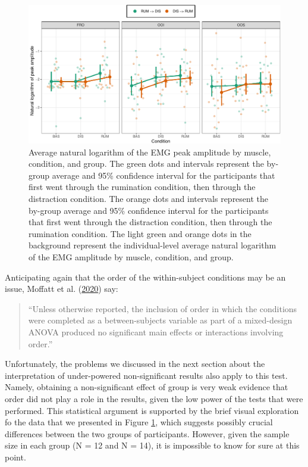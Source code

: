 \documentclass[
  english,
  man, donotrepeattitle,floatsintext]{apa6}
\begin{document}
\begin{figure}[!htb]

{\centering \includegraphics[width=1\linewidth]{manuscript_files/figure-latex/order-1} 

}

\caption{Average natural logarithm of the EMG peak amplitude by muscle, condition, and group. The green dots and intervals represent the by-group average and 95\% confidence interval for the participants that first went through the rumination condition, then through the distraction condition. The orange dots and intervals represent the by-group average and 95\% confidence interval for the participants that first went through the distraction condition, then through the rumination condition. The light green and orange dots in the background represent the individual-level average natural logarithm of the EMG amplitude by muscle, condition, and group.}\label{fig:order}
\end{figure}

Anticipating again that the order of the within-subject conditions may be an issue, Moffatt et al. (\protect\hyperlink{ref-moffatt_inner_2020}{2020}) say:

\begin{quote}
``Unless otherwise reported, the inclusion of order in which the conditions were completed as a between-subjects variable as part of a mixed-design ANOVA produced no significant main effects or interactions involving order.''
\end{quote}

Unfortunately, the problems we discussed in the next section about the interpretation of under-powered non-significant results also apply to this test. Namely, obtaining a non-significant effect of group is very weak evidence that order did not play a role in the results, given the low power of the tests that were performed. This statistical argument is supported by the brief visual exploration fo the data that we presented in Figure \ref{fig:order}, which suggests possibly crucial differences between the two groups of participants. However, given the sample size in each group (N = 12 and N = 14), it is impossible to know for sure at this point.
\end{document}
